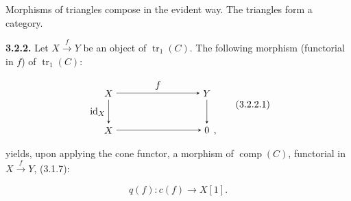Morphisms of triangles compose in the evident way.
The triangles form a category.

\noindent\textbf{3.2.2.}\quad
{}
Let $X\xrightarrow{f}Y$ be an object of $\operatorname{tr}_1(C)$. The
following morphism (functorial in $f$) of $\operatorname{tr}_1(C)$:

\begin{equation}
  \begin{tikzpicture}[>=stealth,baseline=(current bounding box.center)]
    \node (X)  at (0,1.35) {$X$};
    \node (Y)  at (3.6,1.35) {$Y$};
    \node (Xp) at (0,0) {$X$};
    \node (Z)  at (3.6,0) {$0$};
    \node[anchor=base west,inner sep=0pt,xshift=.08em] at (Z.base east) {$,$};
    \draw[->] (X) -- node[above] {$f$} (Y);
    \draw[->] (X) -- node[left] {$\operatorname{id}_X$} (Xp);
    \draw[->] (Y) -- (Z);
    \draw[->] (Xp) -- (Z);
  \end{tikzpicture}
  \tag{3.2.2.1}
\end{equation}

yields, upon applying the cone functor, a morphism of
$\operatorname{comp}(C)$, functorial in $X\xrightarrow{f}Y$, (3.1.7):

\begin{equation}
  q(f)\colon c(f)\longrightarrow X[1].
  \tag{3.2.2.2}
\end{equation}

